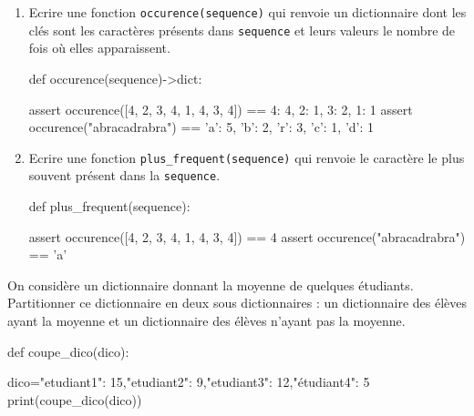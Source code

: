 \pagebreak

\begin{exercice_cours}{\quad}{}

			\begin{enumerate}
				\item  Ecrire une fonction \verb|occurence(sequence)| qui renvoie un dictionnaire dont les clés sont les caractères présents dans \verb|sequence| et leurs valeurs le nombre de fois où elles apparaissent.

				\begin{CodePythontexAlt}[Largeur=1\linewidth,Centre,Lignes=false,PremLigne=1]{}
					def occurence(sequence)->dict:
						  









					assert occurence([4, 2, 3, 4, 1, 4, 3, 4]) == {4: 4, 2: 1, 3: 2, 1: 1}
					assert occurence("abracadrabra") == {'a': 5, 'b': 2, 'r': 3, 'c': 1, 'd': 1}
				\end{CodePythontexAlt}

				\item Ecrire une fonction \verb|plus_frequent(sequence)| qui renvoie le caractère le plus souvent présent dans la \verb|sequence|.
				
				\begin{CodePythontexAlt}[Largeur=1\linewidth,Centre,Lignes=false,PremLigne=1]{}
					def plus_frequent(sequence):
						



					





					assert occurence([4, 2, 3, 4, 1, 4, 3, 4]) == 4
					assert occurence("abracadrabra") == 'a'
				\end{CodePythontexAlt}

			\end{enumerate}


\end{exercice_cours}

	

\begin{exercice_cours}{\quad}{}

	On considère un dictionnaire donnant la moyenne de quelques étudiants. Partitionner ce dictionnaire en deux sous dictionnaires : un dictionnaire
	des élèves ayant la moyenne et un dictionnaire des élèves n'ayant pas la
	moyenne.
	

	\begin{CodePythontexAlt}[Largeur=1\linewidth,Centre,Lignes=false,PremLigne=1]{}
		def coupe_dico(dico):
			









		dico={"etudiant1": 15,"etudiant2": 9,"etudiant3": 12,"étudiant4": 5}
		print(coupe_dico(dico))
	\end{CodePythontexAlt}
\end{exercice_cours}

